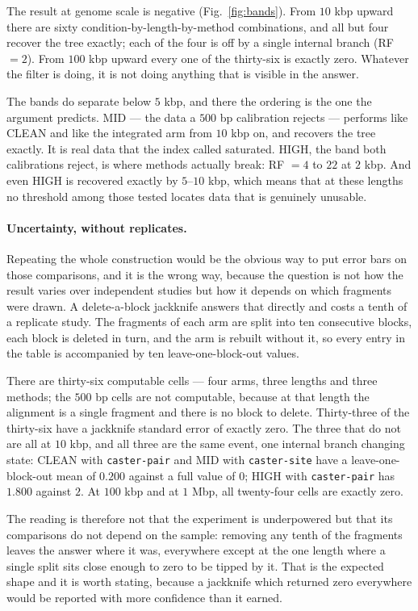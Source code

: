 \documentclass[preprint,12pt,authoryear]{elsarticle}
\theoremstyle{definition}
\theoremstyle{remark}
\begin{document}
The result at genome scale is negative (Fig.~\ref{fig:bands}). From $10$ kbp
upward there are sixty condition-by-length-by-method combinations, and all
but four recover the tree exactly; each of the four is off by a single
internal branch (RF $=2$). From $100$ kbp upward every one of the
thirty-six is exactly zero. Whatever the filter is doing, it is not doing
anything that is visible in the answer.

The bands do separate below $5$ kbp, and there the ordering is the one the
argument predicts. MID --- the data a $500$ bp calibration rejects ---
performs like CLEAN and like the integrated arm from $10$ kbp on, and
recovers the tree exactly. It is real data that the index called saturated.
HIGH, the band both calibrations reject, is where methods actually break:
RF $=4$ to $22$ at $2$ kbp. And even HIGH is recovered exactly by $5$--$10$
kbp, which means that at these lengths no threshold among those tested
locates data that is genuinely unusable.

\paragraph{Uncertainty, without replicates.} Repeating the whole construction
would be the obvious way to put error bars on those comparisons, and it is
the wrong way, because the question is not how the result varies over
independent studies but how it depends on which fragments were drawn. A
delete-a-block jackknife answers that directly and costs a tenth of a
replicate study. The fragments of each arm are split into ten consecutive
blocks, each block is deleted in turn, and the arm is rebuilt without it, so
every entry in the table is accompanied by ten leave-one-block-out values.

There are thirty-six computable cells --- four arms, three lengths and three
methods; the $500$ bp cells are not computable, because at that length the
alignment is a single fragment and there is no block to delete. Thirty-three
of the thirty-six have a jackknife standard error of exactly zero. The three
that do not are all at $10$ kbp, and all three are the same event, one
internal branch changing state: CLEAN with \texttt{caster-pair} and MID with
\texttt{caster-site} have a leave-one-block-out mean of $0.200$ against a
full value of $0$; HIGH with \texttt{caster-pair} has $1.800$ against $2$.
At $100$ kbp and at $1$ Mbp, all twenty-four cells are exactly zero.

The reading is therefore not that the experiment is underpowered but that
its comparisons do not depend on the sample: removing any tenth of the
fragments leaves the answer where it was, everywhere except at the one
length where a single split sits close enough to zero to be tipped by it.
That is the expected shape and it is worth stating, because a jackknife
which returned zero everywhere would be reported with more confidence than
it earned.
\end{document}
